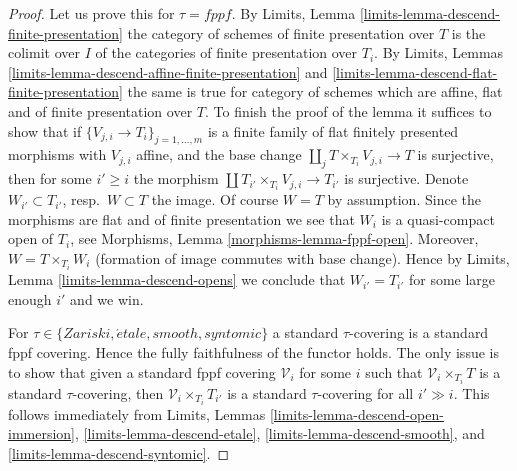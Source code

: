 \documentclass[10pt,a4paper]{amsart}
\theoremstyle{plain}
\theoremstyle{definition}
\theoremstyle{remark}
\numberwithin{equation}{subsection}
\def\etale{{\acute{e}tale}}
\begin{document}
\begin{proof}
Let us prove this for $\tau = fppf$.
By Limits, Lemma \ref{limits-lemma-descend-finite-presentation}
the category of schemes of finite presentation over $T$ is the
colimit over $I$ of the categories of finite presentation over $T_i$. By
Limits, Lemmas \ref{limits-lemma-descend-affine-finite-presentation}
and \ref{limits-lemma-descend-flat-finite-presentation}
the same is true for category of schemes which are affine, flat and
of finite presentation over $T$.
To finish the proof of the lemma it suffices to show that if
$\{V_{j, i} \to T_i\}_{j = 1, \ldots, m}$ is a finite family of
flat finitely presented morphisms with $V_{j, i}$ affine, and the
base change $\coprod_j T \times_{T_i} V_{j, i} \to T$ is surjective,
then for some $i' \geq i$ the morphism
$\coprod T_{i'} \times_{T_i} V_{j, i} \to T_{i'}$ is surjective.
Denote $W_{i'} \subset T_{i'}$, resp.\ $W \subset T$ the image.
Of course $W = T$ by assumption.
Since the morphisms are flat and of finite presentation we see that
$W_i$ is a quasi-compact open of $T_i$, see
Morphisms, Lemma \ref{morphisms-lemma-fppf-open}.
Moreover, $W = T \times_{T_i} W_i$ (formation of image commutes
with base change). Hence by
Limits, Lemma \ref{limits-lemma-descend-opens}
we conclude that $W_{i'} = T_{i'}$ for some large enough $i'$
and we win.

\medskip\noindent
For $\tau \in \{Zariski, \etale, smooth, syntomic\}$ a standard $\tau$-covering
is a standard fppf covering. Hence the fully faithfulness of the functor
holds. The only issue is to show that given a standard fppf covering
$\mathcal{V}_i$ for some $i$ such that $\mathcal{V}_i \times_{T_i} T$
is a standard $\tau$-covering, then $\mathcal{V}_i \times_{T_i} T_{i'}$
is a standard $\tau$-covering for all $i' \gg i$. This follows immediately
from Limits, Lemmas
\ref{limits-lemma-descend-open-immersion},
\ref{limits-lemma-descend-etale},
\ref{limits-lemma-descend-smooth}, and
\ref{limits-lemma-descend-syntomic}.
\end{proof}
\end{document}
